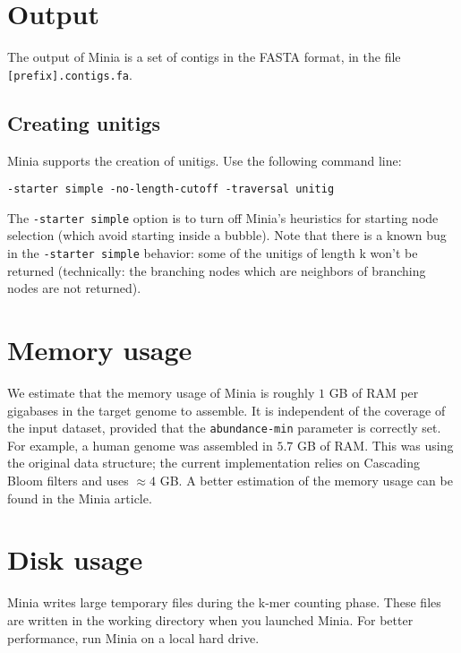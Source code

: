 \documentclass[a4paper]{article}
\begin{document}
\section{Output}

The output of Minia is a set of contigs in the FASTA format, in the file \verb+[prefix].contigs.fa+. 

\subsection*{Creating unitigs}

Minia supports the creation of unitigs. Use the following command line: 
\begin{verbatim}
-starter simple -no-length-cutoff -traversal unitig
\end{verbatim}

The \verb+-starter simple+ option is to turn off Minia's heuristics for starting node selection (which avoid starting inside a bubble).
Note that there is a known bug in the \verb+-starter simple+ behavior: some of the unitigs of length k won't be returned (technically: the branching nodes which are neighbors of branching nodes are not returned).

\section{Memory usage}

We estimate that the memory usage of Minia is roughly $1$ GB of RAM per gigabases in the target genome to assemble. It is independent of the coverage of the input dataset, provided that the \verb!abundance-min! parameter is correctly set. For example, a human genome was assembled in $5.7$ GB of RAM. This was using the original data structure; the current implementation relies on Cascading Bloom filters and uses $\approx 4$ GB. A better estimation of the memory usage can be found in the Minia article.

\section{Disk usage}

Minia writes large temporary files during the k-mer counting phase. These files are written in the working directory when you launched Minia. For better performance, run Minia on a local hard drive. 
\end{document}
